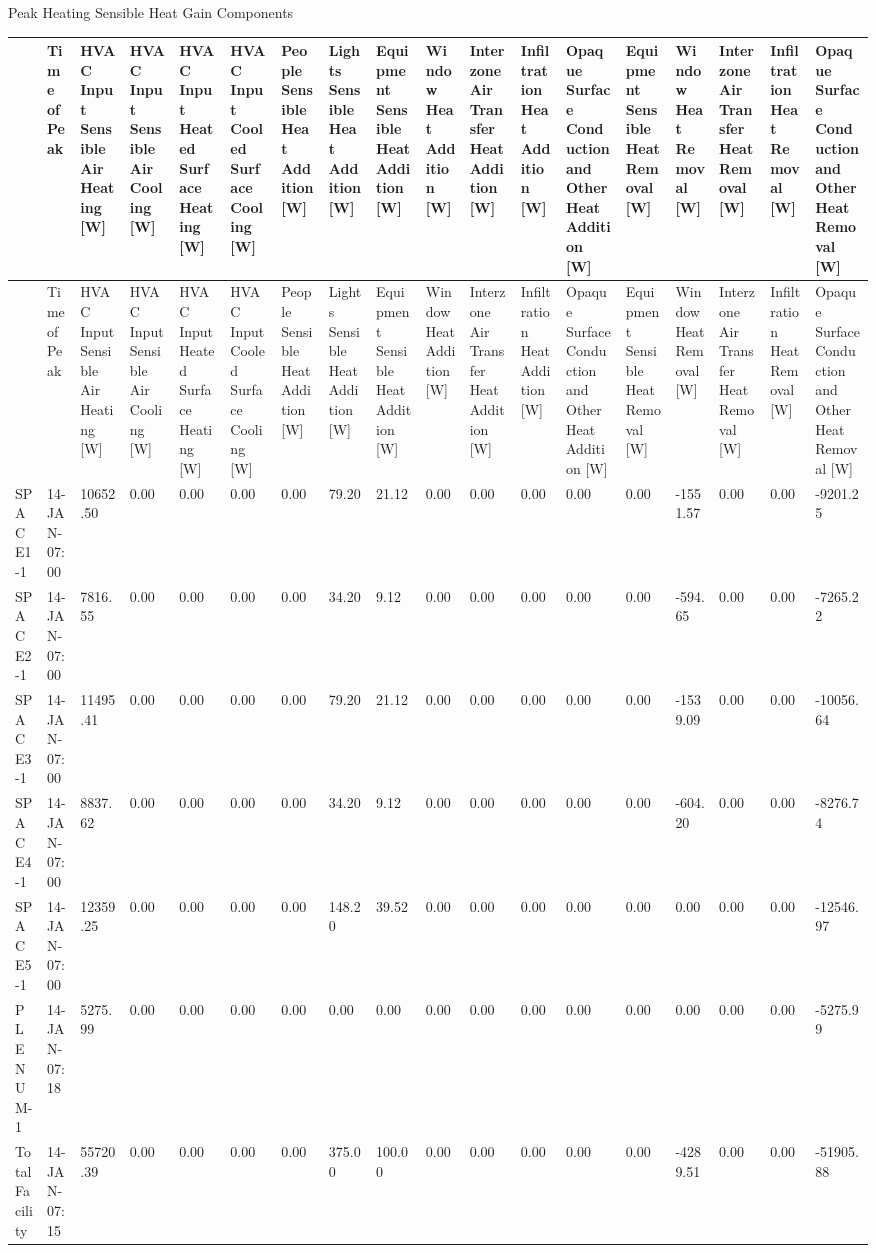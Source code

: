 Peak Heating Sensible Heat Gain Components

{\tiny
\begin{longtable}[c]{>{\raggedright}p{0.28in}>{\raggedright}p{0.28in}>{\raggedright}p{0.28in}>{\raggedright}p{0.28in}>{\raggedright}p{0.28in}>{\raggedright}p{0.28in}>{\raggedright}p{0.28in}>{\raggedright}p{0.28in}>{\raggedright}p{0.28in}>{\raggedright}p{0.28in}>{\raggedright}p{0.28in}>{\raggedright}p{0.28in}>{\raggedright}p{0.28in}>{\raggedright}p{0.28in}>{\raggedright}p{0.28in}>{\raggedright}p{0.28in}>{\raggedright}p{0.28in}>{\raggedright}p{0.28in}}
\toprule
 & Time of Peak & HVAC Input Sensible Air Heating [W] & HVAC Input Sensible Air Cooling [W] & HVAC Input Heated Surface Heating [W] & HVAC Input Cooled Surface Cooling [W] & People Sensible Heat Addition [W] & Lights Sensible Heat Addition [W] & Equipment Sensible Heat Addition [W] & Window Heat Addition [W] & Interzone Air Transfer Heat Addition [W] & Infiltration Heat Addition [W] & Opaque Surface Conduction and Other Heat Addition [W] & Equipment Sensible Heat Removal [W] & Window Heat Removal [W] & Interzone Air Transfer Heat Removal [W] & Infiltration Heat Removal [W] & Opaque Surface Conduction and Other Heat Removal [W] \tabularnewline
\midrule
\endfirsthead

\toprule
 & Time of Peak & HVAC Input Sensible Air Heating [W] & HVAC Input Sensible Air Cooling [W] & HVAC Input Heated Surface Heating [W] & HVAC Input Cooled Surface Cooling [W] & People Sensible Heat Addition [W] & Lights Sensible Heat Addition [W] & Equipment Sensible Heat Addition [W] & Window Heat Addition [W] & Interzone Air Transfer Heat Addition [W] & Infiltration Heat Addition [W] & Opaque Surface Conduction and Other Heat Addition [W] & Equipment Sensible Heat Removal [W] & Window Heat Removal [W] & Interzone Air Transfer Heat Removal [W] & Infiltration Heat Removal [W] & Opaque Surface Conduction and Other Heat Removal [W] \tabularnewline
\midrule
\endhead

SPACE1-1 & 14-JAN-07:00 & 10652.50 & 0.00 & 0.00 & 0.00 & 0.00 & 79.20 & 21.12 & 0.00 & 0.00 & 0.00 & 0.00 & 0.00 & -1551.57 & 0.00 & 0.00 & -9201.25 \tabularnewline
SPACE2-1 & 14-JAN-07:00 & 7816.55 & 0.00 & 0.00 & 0.00 & 0.00 & 34.20 & 9.12 & 0.00 & 0.00 & 0.00 & 0.00 & 0.00 & -594.65 & 0.00 & 0.00 & -7265.22 \tabularnewline
SPACE3-1 & 14-JAN-07:00 & 11495.41 & 0.00 & 0.00 & 0.00 & 0.00 & 79.20 & 21.12 & 0.00 & 0.00 & 0.00 & 0.00 & 0.00 & -1539.09 & 0.00 & 0.00 & -10056.64 \tabularnewline
SPACE4-1 & 14-JAN-07:00 & 8837.62 & 0.00 & 0.00 & 0.00 & 0.00 & 34.20 & 9.12 & 0.00 & 0.00 & 0.00 & 0.00 & 0.00 & -604.20 & 0.00 & 0.00 & -8276.74 \tabularnewline
SPACE5-1 & 14-JAN-07:00 & 12359.25 & 0.00 & 0.00 & 0.00 & 0.00 & 148.20 & 39.52 & 0.00 & 0.00 & 0.00 & 0.00 & 0.00 & 0.00 & 0.00 & 0.00 & -12546.97 \tabularnewline
PLENUM-1 & 14-JAN-07:18 & 5275.99 & 0.00 & 0.00 & 0.00 & 0.00 & 0.00 & 0.00 & 0.00 & 0.00 & 0.00 & 0.00 & 0.00 & 0.00 & 0.00 & 0.00 & -5275.99 \tabularnewline
Total Facility & 14-JAN-07:15 & 55720.39 & 0.00 & 0.00 & 0.00 & 0.00 & 375.00 & 100.00 & 0.00 & 0.00 & 0.00 & 0.00 & 0.00 & -4289.51 & 0.00 & 0.00 & -51905.88 \tabularnewline
\bottomrule
\end{longtable}}

